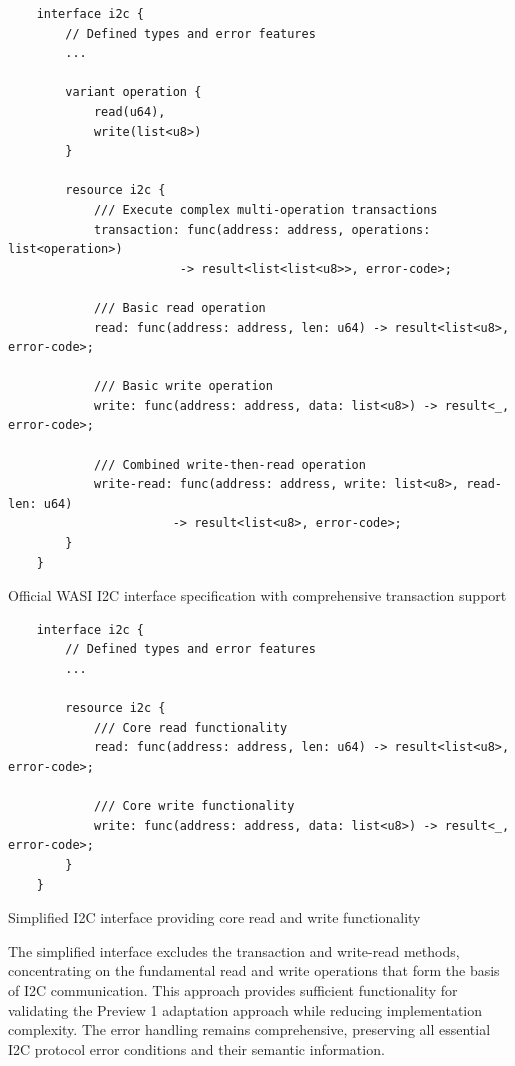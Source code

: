 \begin{listing}[H]
    \begin{verbatim}
    interface i2c {
        // Defined types and error features
        ... 
        
        variant operation {
            read(u64),
            write(list<u8>)
        }
    
        resource i2c {
            /// Execute complex multi-operation transactions
            transaction: func(address: address, operations: list<operation>) 
                        -> result<list<list<u8>>, error-code>;
            
            /// Basic read operation
            read: func(address: address, len: u64) -> result<list<u8>, error-code>;
            
            /// Basic write operation  
            write: func(address: address, data: list<u8>) -> result<_, error-code>;
            
            /// Combined write-then-read operation
            write-read: func(address: address, write: list<u8>, read-len: u64) 
                       -> result<list<u8>, error-code>;
        }
    }
    \end{verbatim}
    \caption{Official WASI I2C interface specification with comprehensive transaction support}
    \label{lst:official-i2c-interface}
\end{listing}

\begin{listing}[H]
    \begin{verbatim}
    interface i2c {
        // Defined types and error features
        ... 
    
        resource i2c {
            /// Core read functionality
            read: func(address: address, len: u64) -> result<list<u8>, error-code>;
            
            /// Core write functionality
            write: func(address: address, data: list<u8>) -> result<_, error-code>;
        }
    }
    \end{verbatim}
    \caption{Simplified I2C interface providing core read and write functionality}
    \label{lst:simplified-i2c-interface}
\end{listing}

The simplified interface excludes the transaction and write-read methods, concentrating on the fundamental read and write operations that form the basis of I2C communication. This approach provides sufficient functionality for validating the Preview 1 adaptation approach while reducing implementation complexity. The error handling remains comprehensive, preserving all essential I2C protocol error conditions and their semantic information.

